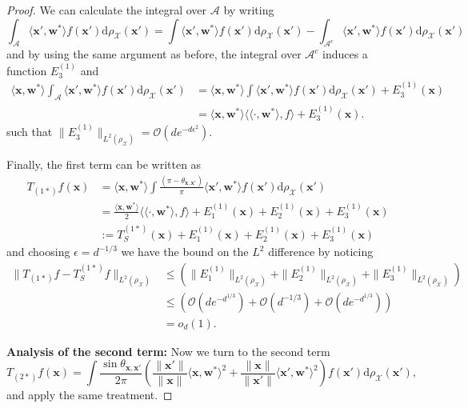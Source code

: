 \begin{proof}
    We can calculate the integral over $\mathcal{A}$ by writing
    \[
        \int_{\mathcal{A}} \langle \bm x', \bm w^*\rangle f(\bm x')\mathrm d\rho_{\mathcal X}(\bm x') = \int \langle \bm x', \bm w^*\rangle f(\bm x')\mathrm d\rho_{\mathcal X}(\bm x') - \int_{\mathcal{A}^c} \langle \bm x', \bm w^*\rangle f(\bm x')\mathrm d\rho_{\mathcal X}(\bm x')
    \]
    and by using the same argument as before, the integral over $\mathcal{A}^c$ induces a function $E_3^{(1)}$ and
    \begin{align*}
        \langle \bm x, \bm w^*\rangle\int_{\mathcal{A}} \langle \bm x', \bm w^*\rangle f(\bm x')\mathrm d\rho_{\mathcal X}(\bm x') &= \langle \bm x, \bm w^*\rangle\int \langle \bm x', \bm w^*\rangle f(\bm x')\mathrm d\rho_{\mathcal X}(\bm x') +  E_3^{(1)}(\bm x)\\
        &=\langle \bm x, \bm w^*\rangle\langle\langle \cdot, \bm w^*\rangle, f\rangle +  E_3^{(1)}(\bm x).
    \end{align*}
    such that $\|E_3^{(1)}\|_{L^2(\rho_{\mathcal X})} = \mathcal O(de^{-d\epsilon^2})$.
    
    Finally, the first term can be written as
    \begin{align*}
        T_{(1*)}f(\bm x) &= \langle \bm x, \bm w^*\rangle\int \frac{(\pi - \theta_{\bm x, \bm x'})}{\pi}\langle \bm x', \bm w^*\rangle f(\bm x')\mathrm d\rho_{\mathcal X}(\bm x') \\
        &= \frac{\langle \bm x, \bm w^*\rangle}{2}\langle\langle \cdot, \bm w^*\rangle,f\rangle + E_1^{(1)}(\bm x) + E_2^{(1)}(\bm x) + E_3^{(1)}(\bm x)\\
        &:= T_{S}^{(1*)}(\bm x)+ E_1^{(1)}(\bm x) + E_2^{(1)}(\bm x) + E_3^{(1)}(\bm x)
    \end{align*}
    and choosing $\epsilon = d^{-1/3}$ we have the bound on the $L^2$ difference by noticing
    \begin{align*}
        \|T_{(1*)}f - T_{S}^{(1*)}f\|_{L^2(\rho_{\mathcal X})} &\leq \left(\|E_1^{(1)}\|_{L^2(\rho_{\mathcal X})} + \|E_2^{(1)}\|_{L^2(\rho_{\mathcal X})} +\|E_3^{(1)}\|_{L^2(\rho_{\mathcal X})}\right) \\
        &\leq \left(\mathcal O(de^{-d^{1/3}})+\mathcal O(d^{-1/3}) + \mathcal O(de^{-d^{1/3}})\right)\\
        &= o_d(1).
    \end{align*} 

    {\bf Analysis of the second term:}
    Now we turn to the second term
    \[
        T_{(2*)}f(\bm x) = \int\frac{\sin \theta_{\bm x, \bm x'}}{2\pi}\left(\frac{\|\bm x'\|}{\|\bm x\|}\langle \bm x, \bm w^*\rangle^2 + \frac{\|\bm x\|}{\|\bm x'\|}\langle \bm x', \bm w^*\rangle^2\right)f(\bm x')\mathrm d\rho_{\mathcal X}(\bm x'),
    \]
    and apply the same treatment.


\end{proof}
